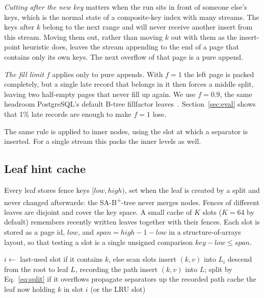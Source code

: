 \documentclass[conference]{IEEEtran}
\newcommand{\sab}{SA-B\textsuperscript{+}-tree}
\begin{document}
\emph{Cutting after the new key} matters when the run sits in front of
someone else's keys, which is the normal state of a composite-key index with
many streams. The keys after $k$ belong to the next range and will never
receive another insert from this stream. Moving them out, rather than moving
$k$ out with them as the insert-point heuristic does, leaves the stream
appending to the end of a page that contains only its own keys. The next
overflow of that page is a pure append.

\emph{The fill limit $f$} applies only to pure appends. With $f=1$ the left
page is packed completely, but a single late record that belongs in it then
forces a middle split, leaving two half-empty pages that never fill up again.
We use $f=0.9$, the same headroom PostgreSQL's default B-tree fillfactor
leaves~\cite{pgfillfactor}. Section~\ref{sec:eval} shows that 1\% late
records are enough to make $f=1$ lose.

The same rule is applied to inner nodes, using the slot at which a separator
is inserted. For a single stream this packs the inner levels as well.

\subsection{Leaf hint cache}
\label{sec:hints}
Every leaf stores fence keys $[\mathit{low},\mathit{high})$, set when the leaf
is created by a split and never changed afterwards: the \sab{} never merges
nodes. Fences of different leaves are disjoint and cover the key space. A
small cache of $K$ slots ($K=64$ by default) remembers recently written leaves
together with their fences. Each slot is stored as a page id, $\mathit{low}$,
and $\mathit{span}=\mathit{high}-1-\mathit{low}$ in a structure-of-arrays
layout, so that testing a slot is a single unsigned comparison
$\mathit{key}-\mathit{low}\le\mathit{span}$.

\begin{algorithm}[t]
\caption{Insert with leaf hints (single-threaded)}
\label{alg:insert}
\begin{algorithmic}[1]
    \State $i \gets$ last-used slot if it contains $k$, else scan slots
      \State insert $(k,v)$ into $L_i$ 
      \State \Return
    \EndIf
  \EndIf
  \State descend from the root to leaf $L$, recording the path
  \State insert $(k,v)$ into $L$; split by Eq.~\eqref{eq:split} if it overflows
  \State propagate separators up the recorded path
  \State cache the leaf now holding $k$ in slot $i$ (or the LRU slot)
\EndProcedure
\end{algorithmic}
\end{algorithm}
\end{document}
